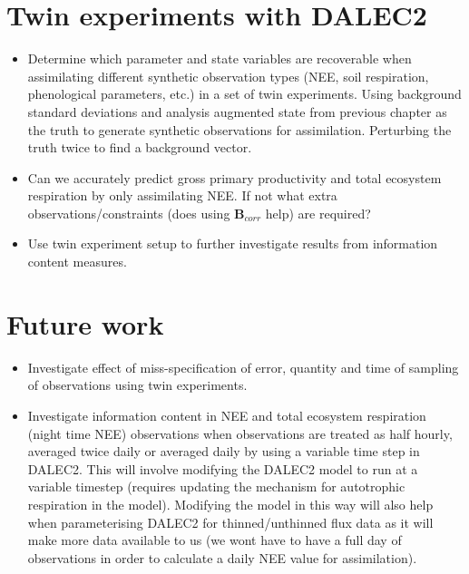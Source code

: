 \documentclass[11pt]{article}
\begin{document}
\section{Twin experiments with DALEC2}
\begin{itemize}
\item Determine which parameter and state variables are recoverable when assimilating different synthetic observation types (NEE, soil respiration, phenological parameters, etc.) in a set of twin experiments. Using background standard deviations and analysis augmented state from previous chapter as the truth to generate synthetic observations for assimilation. Perturbing the truth twice to find a background vector. 

\item Can we accurately predict gross primary productivity and total ecosystem respiration by only assimilating NEE. If not what extra observations/constraints (does using $\textbf{B}_{corr}$ help) are required?

\item Use twin experiment setup to further investigate results from information content measures.
\end{itemize}

\section{Future work}
\begin{itemize}
\item Investigate effect of miss-specification of error, quantity and time of sampling of observations using twin experiments.

\item Investigate information content in NEE and total ecosystem respiration (night time NEE) observations when observations are treated as half hourly, averaged twice daily or averaged daily by using a variable time step in DALEC2. This will involve modifying the DALEC2 model to run at a variable timestep (requires updating the mechanism for autotrophic respiration in the model). Modifying the model in this way will also help when parameterising DALEC2 for thinned/unthinned flux data as it will make more data available to us (we wont have to have a full day of observations in order to calculate a daily NEE value for assimilation). 
\end{itemize}

{}
\end{document}
